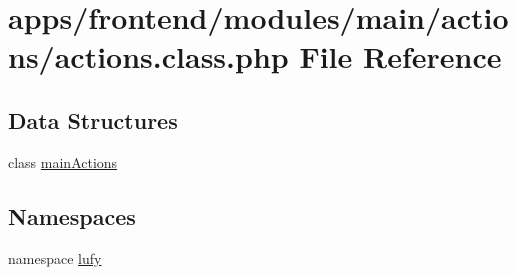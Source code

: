 \hypertarget{frontend_2modules_2main_2actions_2actions_8class_8php}{\section{apps/frontend/modules/main/actions/actions.class.\-php File Reference}
\label{frontend_2modules_2main_2actions_2actions_8class_8php}
}
\subsection*{Data Structures}
\begin{DoxyCompactItemize}
\item 
class \hyperlink{classmain_actions}{main\-Actions}
\end{DoxyCompactItemize}
\subsection*{Namespaces}
\begin{DoxyCompactItemize}
\item 
namespace \hyperlink{namespacelufy}{lufy}
\end{DoxyCompactItemize}
